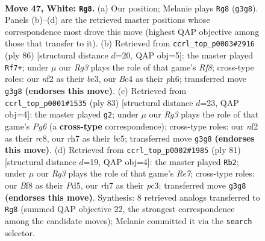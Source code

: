 \documentclass[11pt]{article}
\begin{document}
\clearpage

\begin{figure}[p]\centering
\begin{subfigure}{0.46\textwidth}\centering
\resizebox{\linewidth}{!}{%
\newchessgame
\chessboard[
  setfen={5B2/pb1p3r/8/5k2/2B5/6R1/PPK2n2/8 w - - 14 47},
  showmover=false,
  pgfstyle=straightmove, color=movearrow, markmove={g3-g8}
]}
\caption{}
\end{subfigure}\hfill
\begin{subfigure}{0.46\textwidth}\centering
\resizebox{\linewidth}{!}{%
\newchessgame
\chessboard[
  setfen={5R2/3k4/pr5p/8/4KP2/2b4P/B7/8 w - - 6 44},
  showmover=false,
  pgfstyle=straightmove, color=movearrow, markmove={f8-f7}
]}
\caption{}
\end{subfigure}
\\[4pt]
\begin{subfigure}{0.46\textwidth}\centering
\resizebox{\linewidth}{!}{%
\newchessgame
\chessboard[
  setfen={2R5/5k2/P3p3/2B5/2P1b3/1K4p1/8/3r4 b - - 2 42},
  showmover=false,
  pgfstyle=straightmove, color=movearrow, markmove={g3-g2}
]}
\caption{}
\end{subfigure}\hfill
\begin{subfigure}{0.46\textwidth}\centering
\resizebox{\linewidth}{!}{%
\newchessgame
\chessboard[
  setfen={8/1P3pk1/8/3p4/b7/2P2NK1/P3r3/2R5 b - - 1 41},
  showmover=false,
  pgfstyle=straightmove, color=movearrow, markmove={e2-b2}
]}
\caption{}
\end{subfigure}
\caption{\textbf{Move 47, White: \texttt{Rg8}.} (a) Our position; Melanie plays \texttt{Rg8} (\texttt{g3g8}). Panels (b)--(d) are the retrieved master positions whose correspondence most drove this move (highest QAP objective among those that transfer to it). (b) Retrieved from \texttt{ccrl\_top\_p0003\#2916} (ply 86) [structural distance $d$=20, QAP obj=5]: the master played \texttt{Rf7+}; under $\mu$ our \emph{Rg3} plays the role of that game's \emph{Rf8}; cross-type roles: our \emph{n}f2 as their \emph{b}c3, our \emph{B}c4 as their \emph{p}h6; transferred move \texttt{g3g8} \textbf{(endorses this move)}. (c) Retrieved from \texttt{ccrl\_top\_p0001\#1535} (ply 83) [structural distance $d$=23, QAP obj=4]: the master played \texttt{g2}; under $\mu$ our \emph{Rg3} plays the role of that game's \emph{Pg6} (a \textbf{cross-type} correspondence); cross-type roles: our \emph{n}f2 as their \emph{r}c8, our \emph{r}h7 as their \emph{b}c5; transferred move \texttt{g3g8} \textbf{(endorses this move)}. (d) Retrieved from \texttt{ccrl\_top\_p0002\#1985} (ply 81) [structural distance $d$=19, QAP obj=4]: the master played \texttt{Rb2}; under $\mu$ our \emph{Rg3} plays the role of that game's \emph{Re7}; cross-type roles: our \emph{B}f8 as their \emph{P}d5, our \emph{r}h7 as their \emph{p}c3; transferred move \texttt{g3g8} \textbf{(endorses this move)}. Synthesis: 8 retrieved analogs transferred to \texttt{Rg8} (summed QAP objective 22, the strongest correspondence among the candidate moves); Melanie committed it via the \texttt{search} selector.}
\label{fig:thought-m92}
\end{figure}
\end{document}
